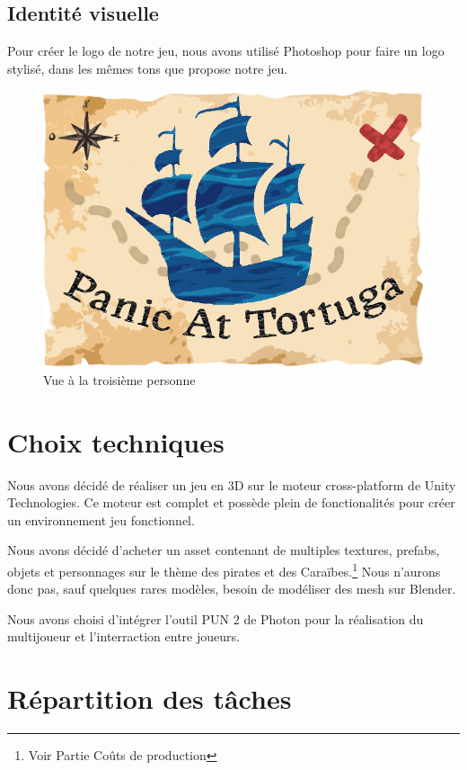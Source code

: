 \documentclass[french, 12pt]{article}
\begin{document}
\subsection{Identité visuelle}
Pour créer le logo de notre jeu, nous avons utilisé Photoshop pour faire un logo stylisé, dans les mêmes tons que propose notre jeu.
\begin{figure}[hbt!]
    \centering
    \includegraphics[scale=0.5]{logo.png}
    \caption{Vue à la troisième personne}
\end{figure}

\section{Choix techniques}

Nous avons décidé de réaliser un jeu en 3D sur le moteur cross-platform de Unity Technologies.
Ce moteur est complet et possède plein de fonctionalités pour créer un environnement jeu fonctionnel.

Nous avons décidé d'acheter un asset contenant de multiples textures, prefabs, objets et personnages sur le thème des pirates et des Caraïbes.\footnote{Voir Partie Coûts de production}
Nous n'aurons donc pas, sauf quelques rares modèles, besoin de modéliser des mesh sur Blender.

Nous avons choisi d'intégrer l'outil PUN 2 de Photon pour la réalisation du multijoueur et l'interraction entre joueurs.


\newpage
\section{Répartition des tâches}
\end{document}
